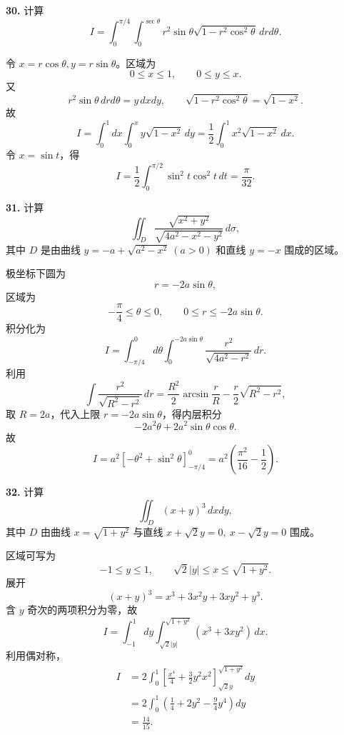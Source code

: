\begin{problemblock}
\textbf{30.} 计算
\[
I=\int_0^{\pi/4}\int_0^{\sec\theta}
r^2\sin\theta\sqrt{1-r^2\cos^2\theta}\,drd\theta.
\]
\end{problemblock}

\begin{solutionblock}
令 \(x=r\cos\theta,y=r\sin\theta\)。区域为
\[
0\le x\le1,\qquad 0\le y\le x.
\]
又
\[
r^2\sin\theta\,drd\theta
=y\,dxdy,
\qquad
\sqrt{1-r^2\cos^2\theta}=\sqrt{1-x^2}.
\]
故
\[
I=\int_0^1dx\int_0^xy\sqrt{1-x^2}\,dy
=\frac12\int_0^1x^2\sqrt{1-x^2}\,dx.
\]
令 \(x=\sin t\)，得
\[
I=\frac12\int_0^{\pi/2}\sin^2t\cos^2t\,dt
=\boxed{\frac{\pi}{32}}.
\]
\end{solutionblock}

\begin{problemblock}
\textbf{31.} 计算
\[
\iint_D\frac{\sqrt{x^2+y^2}}{\sqrt{4a^2-x^2-y^2}}\,d\sigma,
\]
其中 \(D\) 是由曲线 \(y=-a+\sqrt{a^2-x^2}\ (a>0)\) 和直线 \(y=-x\) 围成的区域。
\end{problemblock}

\begin{solutionblock}
极坐标下圆为
\[
r=-2a\sin\theta,
\]
区域为
\[
-\frac{\pi}{4}\le\theta\le0,\qquad 0\le r\le-2a\sin\theta.
\]
积分化为
\[
I=\int_{-\pi/4}^0d\theta\int_0^{-2a\sin\theta}
\frac{r^2}{\sqrt{4a^2-r^2}}\,dr.
\]
利用
\[
\int\frac{r^2}{\sqrt{R^2-r^2}}\,dr
=\frac{R^2}{2}\arcsin\frac rR-\frac r2\sqrt{R^2-r^2},
\]
取 \(R=2a\)，代入上限 \(r=-2a\sin\theta\)，得内层积分
\[
-2a^2\theta+2a^2\sin\theta\cos\theta.
\]
故
\[
I=a^2\left[-\theta^2+\sin^2\theta\right]_{-\pi/4}^0
=\boxed{a^2\left(\frac{\pi^2}{16}-\frac12\right)}.
\]
\end{solutionblock}

\begin{problemblock}
\textbf{32.} 计算
\[
\iint_D(x+y)^3\,dxdy,
\]
其中 \(D\) 由曲线 \(x=\sqrt{1+y^2}\) 与直线 \(x+\sqrt2y=0,\ x-\sqrt2y=0\) 围成。
\end{problemblock}

\begin{solutionblock}
区域可写为
\[
-1\le y\le1,\qquad \sqrt2|y|\le x\le\sqrt{1+y^2}.
\]
展开
\[
(x+y)^3=x^3+3x^2y+3xy^2+y^3.
\]
含 \(y\) 奇次的两项积分为零，故
\[
I=\int_{-1}^1dy\int_{\sqrt2|y|}^{\sqrt{1+y^2}}(x^3+3xy^2)\,dx.
\]
利用偶对称，
\[
\begin{aligned}
I&=2\int_0^1\left[
\frac{x^4}{4}+\frac{3}{2}y^2x^2
\right]_{\sqrt2y}^{\sqrt{1+y^2}}dy\\
&=2\int_0^1\left(\frac14+2y^2-\frac94y^4\right)dy\\
&=\boxed{\frac{14}{15}}.
\end{aligned}
\]
\end{solutionblock}

